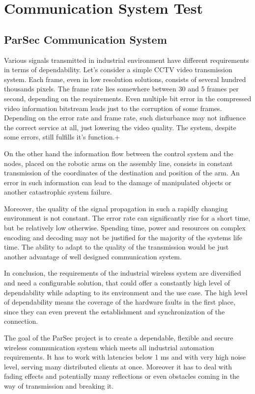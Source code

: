 \chapter{Communication System Test}



\section {ParSec Communication System}
Various signals transmitted in industrial environment have different requirements in terms of dependability. Let's consider a simple CCTV video transmission system. Each frame, even in low resolution solutions, consists of several hundred thousands pixels. The frame rate lies somewhere between 30 and 5 frames per second, depending on the requirements. Even multiple bit error in the compressed video information bitstream leads just to the corruption of some frames. Depending on the error rate and frame rate, such disturbance may not influence the correct service at all, just lowering the video quality. The system, despite some errors, still fulfills it's function.+

On the other hand the information flow between the control system and the nodes, placed on the robotic arms on the assembly line, consists in constant transmission of the coordinates of the destination and position of the arm. An error in such information can lead to the damage of manipulated objects or another catastrophic system failure.

Moreover, the quality of the signal propagation in such a rapidly changing environment is not constant. The error rate can significantly rise for a short time, but be relatively low otherwise. Spending time, power and resources on complex encoding and decoding may not be justified for the majority of the systems life time. The ability to adapt to the quality of the transmission would be just another advantage of well designed communication system.

In conclusion, the requirements of the industrial wireless system are diversified and need a configurable solution, that could offer a constantly high level of dependability while adapting to its environment and the use case. The high level of dependability means the coverage of the hardware faults in the first place, since they can even prevent the establishment and synchronization of the connection.

The goal of the ParSec project is to create a dependable, flexible and secure wireless communication system which meets all industrial automation requirements. It has to work with latencies below 1 ms and with very high noise level, serving many distributed clients at once. Moreover it has to deal with fading effects and potentially many reflections or even obstacles coming in the way of transmission and breaking it.

